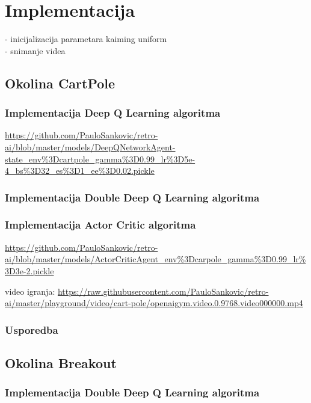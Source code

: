 \chapter{Implementacija}

- inicijalizacija parametara kaiming uniform \\
- snimanje videa

\section{Okolina CartPole}

\subsection{Implementacija Deep Q Learning algoritma}

\url{https://github.com/PauloSankovic/retro-ai/blob/master/models/DeepQNetworkAgent-state_env\%3Dcartpole_gamma\%3D0.99_lr\%3D5e-4_bs\%3D32_es\%3D1_ee\%3D0.02.pickle}

\subsection{Implementacija Double Deep Q Learning algoritma}

\subsection{Implementacija Actor Critic algoritma}

\url{https://github.com/PauloSankovic/retro-ai/blob/master/models/ActorCriticAgent_env\%3Dcarpole_gamma\%3D0.99_lr\%3D3e-2.pickle}

video igranja:
\url{https://raw.githubusercontent.com/PauloSankovic/retro-ai/master/playground/video/cart-pole/openaigym.video.0.9768.video000000.mp4}

\subsection{Usporedba}

\section{Okolina Breakout}

\subsection{Implementacija Double Deep Q Learning algoritma}

